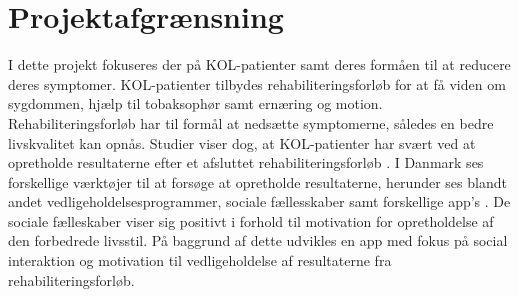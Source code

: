 \section{Projektafgrænsning}
I dette projekt fokuseres der på KOL-patienter samt deres formåen til at reducere deres symptomer. KOL-patienter tilbydes rehabiliteringsforløb for at få viden om sygdommen, hjælp til tobaksophør samt ernæring og motion. Rehabiliteringsforløb har til formål at nedsætte symptomerne, således en bedre livskvalitet kan opnås.\cite{McCarthy2015,Habraken2011,Sundhedsstyrelsen2015,Lungeforeningen2016} Studier viser dog, at KOL-patienter har svært ved at opretholde resultaterne efter et afsluttet rehabiliteringsforløb \cite{Egan2012,Beachamp2013,Zanaboni2017,Ringbaek2008}. I Danmark ses forskellige værktøjer til at forsøge at opretholde resultaterne, herunder ses blandt andet vedligeholdelsesprogrammer, sociale fællesskaber samt forskellige app's \cite{HealthcareDenmark2017,Sundhedsstyrelsen2015}. De sociale fælleskaber viser sig positivt i forhold til motivation for opretholdelse af den forbedrede livsstil.\cite{dsam2016}
På baggrund af dette udvikles en app med fokus på social interaktion og motivation til vedligeholdelse af resultaterne fra rehabiliteringsforløb. 
